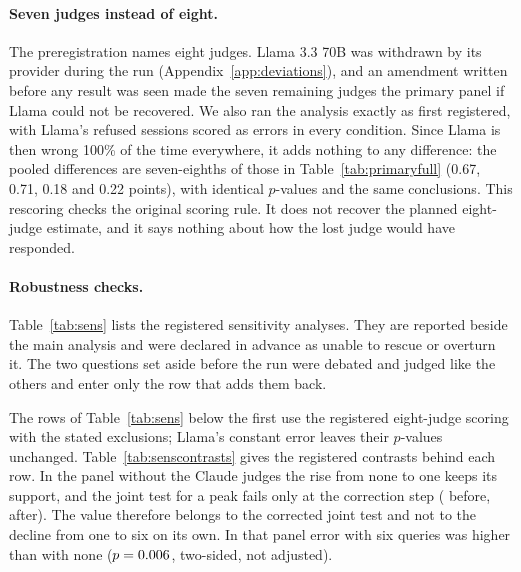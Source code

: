 \begin{table}[h]
\centering
\caption{Registered secondary comparisons, in percentage points. Intervals are not adjusted for multiplicity.}
\label{tab:secondary}
\small

\end{table}

\paragraph{Seven judges instead of eight.} The preregistration names eight judges. Llama 3.3 70B was withdrawn by
its provider during the run (Appendix~\ref{app:deviations}), and an amendment written before any result was seen made
the seven remaining judges the primary panel if Llama could not be recovered. We also ran the analysis exactly as
first registered, with Llama's refused sessions scored as errors in every condition. Since Llama is then wrong 100\%
of the time everywhere, it adds nothing to any difference: the pooled differences are seven-eighths of those in
Table~\ref{tab:primaryfull} (0.67, 0.71, 0.18 and 0.22 points), with identical $p$-values and the same conclusions.
This rescoring checks the original scoring rule. It does not recover the planned eight-judge estimate, and it says
nothing about how the lost judge would have responded.

\paragraph{Robustness checks.} Table~\ref{tab:sens} lists the registered sensitivity analyses. They are reported
beside the main analysis and were declared in advance as unable to rescue or overturn it. The two questions set
aside before the run were debated and judged like the others and enter only the row that adds them back.

\begin{table}[h]
\centering
\caption{Registered sensitivity analyses: is the peak still supported?}
\label{tab:sens}
\small

\end{table}

The rows of Table~\ref{tab:sens} below the first use the registered eight-judge scoring with the stated exclusions;
Llama's constant error leaves their $p$-values unchanged. Table~\ref{tab:senscontrasts} gives the registered
contrasts behind each row. In the panel without the Claude judges the rise from none to one keeps its support, and
the joint test for a peak fails only at the correction step (\ncPJoint{} before, \pHolmOneNoClaude{} after). The
value \pHolmOneNoClaude{} therefore belongs to the corrected joint test and not to the decline from one to six on its
own. In that panel error with six queries was \ncSixZero{} \pp{} higher than with none ($p = 0.006$, two-sided,
not adjusted).

